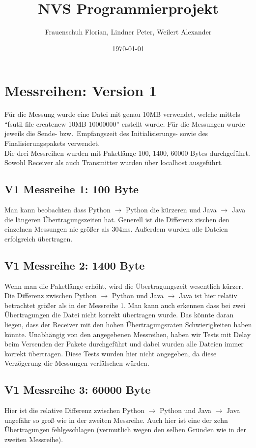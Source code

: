 \documentclass{article}
\title{NVS Programmierprojekt}
\author{Frauenschuh Florian, Lindner Peter, Weilert Alexander}
\date{\today}
\begin{document}
    \maketitle

    \section{Messreihen: Version 1}\label{sec:messreihen:-version-1}
    Für die Messung wurde eine Datei mit genau 10MB verwendet, welche mittels \enquote{fsutil file createnew 10MB 10000000} erstellt wurde.
    Für die Messungen wurde jeweils die Sende- bzw.\ Empfangszeit des Initialisierungs- sowie des Finalisierungspakets verwendet. \\
    Die drei Messreihen wurden mit Paketlänge 100, 1400, 60000 Bytes durchgeführt. \\
    Sowohl Receiver als auch Transmitter wurden über localhost ausgeführt.

    \subsection{V1 Messreihe 1: 100 Byte}\label{subsec:messreihe-1:-100-byte}
    Man kann beobachten dass Python $\rightarrow$ Python die kürzeren und Java $\rightarrow$ Java die längeren Übertragungszeiten hat.
    Generell ist die Differenz zischen den einzelnen Messungen nie größer als 304ms.
    Außerdem wurden alle Dateien erfolgreich übertragen.

    \subsection{V1 Messreihe 2: 1400 Byte}\label{subsec:messreihe-2:-1400-byte}
    Wenn man die Paketlänge erhöht, wird die Übertragungszeit wesentlich kürzer.
    Die Differenz zwischen Python $\rightarrow$ Python und Java $\rightarrow$ Java ist hier relativ betrachtet größer als in der Messreihe 1.
    Man kann auch erkennen dass bei zwei Übertragungen die Datei nicht korrekt übertragen wurde.
    Das könnte daran liegen, dass der Receiver mit den hohen Übertragungsraten Schwierigkeiten haben könnte.
    Unabhängig von den angegebenen Messreihen, haben wir Tests mit Delay beim Versenden der Pakete durchgeführt und dabei wurden alle Dateien immer korrekt übertragen.
    Diese Tests wurden hier nicht angegeben, da diese Verzögerung die Messungen verfälschen würden.

    \subsection{V1 Messreihe 3: 60000 Byte}\label{subsec:messreihe-2:-60000-byte}
    Hier ist die relative Differenz zwischen Python $\rightarrow$ Python und Java $\rightarrow$ Java ungefähr so groß wie in der zweiten Messreihe.
    Auch hier ist eine der zehn Übertragungen fehlgeschlagen (vermutlich wegen den selben Gründen wie in der zweiten Messreihe).
\end{document}
